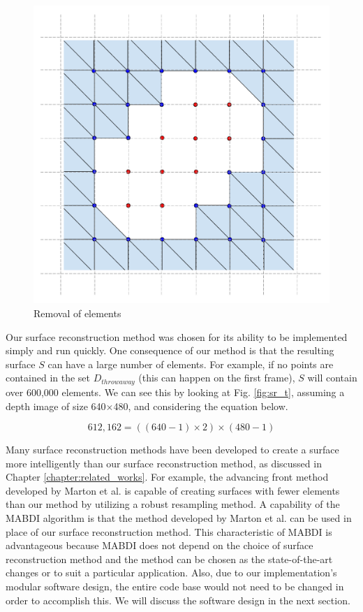 \begin{figure}[h]%
\centering
  \includegraphics[width=.70\textwidth]{figures/approach_sr_element_removal.pdf}
  \caption{Removal of elements}
  \label{fig:sr_em}
\end{figure}

Our surface reconstruction method was chosen for its ability to be implemented
simply and run quickly. One consequence of our method is that the resulting
surface $S$ can have a large number of elements. For example, if no points are
contained in the set $D_{throwaway}$ (this can happen on the first frame), $S$
will contain over 600,000 elements. We can see this by looking at Fig.
\ref{fig:sr_t}, assuming a depth image of size 640$\times$480, and considering
the equation below.

\begin{equation}
  612,162 = ((640-1)\times2)\times(480-1)
\end{equation}

Many surface reconstruction methods have been developed to create a surface more
intelligently than our surface reconstruction method, as discussed in Chapter
\ref{chapter:related_works}. For example, the advancing front method developed
by Marton et al. \cite{Marton2009} is capable of creating surfaces with fewer
elements than our method by utilizing a robust resampling method. A capability
of the MABDI algorithm is that the method developed by Marton et al. can be used
in place of our surface reconstruction method. This characteristic of MABDI is
advantageous because MABDI does not depend on the choice of surface
reconstruction method and the method can be chosen as the state-of-the-art
changes or to suit a particular application. Also, due to our implementation's
modular software design, the entire code base would not need to be changed in
order to accomplish this. We will discuss the software design in the next
section.

